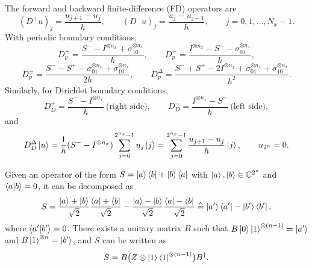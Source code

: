 The forward and backward finite-difference (FD) operators are
\begin{equation}
  (D^+ u)_j = \frac{u_{j+1} - u_j}{h}, \qquad (D^- u)_j = \frac{u_j - u_{j-1}}{h}, \qquad j = 0, 1, \dots, N_x - 1.
\end{equation}
With periodic boundary conditions,
\begin{equation}
  D_p^+ = \frac{S^- - I^{\otimes n_x} + \sigma_{10}^{\otimes n_x}}{h}, \qquad
  D_p^- = \frac{I^{\otimes n_x} - S^+ - \sigma_{01}^{\otimes n_x}}{h},
\end{equation}
\begin{equation}
  D_p^{\pm} = \frac{S^- - S^+ - \sigma_{01}^{\otimes n_x} + \sigma_{10}^{\otimes n_x}}{2h}, \qquad
  D_p^{\Delta} = \frac{S^- + S^+ - 2I^{\otimes n_x} + \sigma_{01}^{\otimes n_x} + \sigma_{10}^{\otimes n_x}}{h^2}.
\end{equation}
Similarly, for Dirichlet boundary conditions,
\begin{equation}
  D_D^+ = \frac{S^- - I^{\otimes n_x}}{h}\ \text{(right side)}, \qquad
  D_D^- = \frac{I^{\otimes n_x} - S^+}{h}\ \text{(left side)},
\end{equation}
and
\begin{equation}
  D_D^{\Delta}\ket{u} = \frac{1}{h}(S^- - I^{\otimes n_x})\sum_{j=0}^{2^{n_x}-1} u_j\ket{j}
  = \sum_{j=0}^{2^{n_x}-1} \frac{u_{j+1} - u_j}{h}\ket{j}, \qquad u_{2^n} = 0.
\end{equation}

\begin{lemma}\label{lem:sec06-decomp}
Given an operator of the form $S = \ket{a}\bra{b} + \ket{b}\bra{a}$ with
$\ket{a}, \ket{b} \in \mathbb{C}^{2^n}$ and $\braket{a|b} = 0$, it can be decomposed as
\begin{equation}
  S = \frac{\ket{a}+\ket{b}}{\sqrt{2}}\frac{\bra{a}+\bra{b}}{\sqrt{2}} - \frac{\ket{a}-\ket{b}}{\sqrt{2}}\frac{\bra{a}-\bra{b}}{\sqrt{2}}
  \triangleq \ket{a'}\bra{a'} - \ket{b'}\bra{b'},
\end{equation}
where $\braket{a'|b'} = 0$. There exists a unitary matrix $B$ such that
$B\ket{0}\ket{1}^{\otimes(n-1)} = \ket{a'}$ and $B\ket{1}^{\otimes n} = \ket{b'}$,
and $S$ can be written as
\begin{equation}
  S = B\bigl(Z \otimes \ket{1}\bra{1}^{\otimes(n-1)}\bigr)B^{\dagger}.
\end{equation}
\end{lemma}

